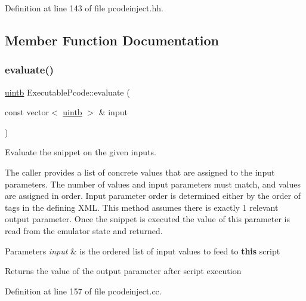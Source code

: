 Definition at line 143 of file pcodeinject.\+hh.



\subsection{Member Function Documentation}
\mbox{\label{class_executable_pcode_a0ff39a9bb778d67df86b741a20739d75}} 
\subsubsection{\texorpdfstring{evaluate()}{evaluate()}}
{\footnotesize\ttfamily \mbox{\hyperlink{types_8h_a2db313c5d32a12b01d26ac9b3bca178f}{uintb}} Executable\+Pcode\+::evaluate (\begin{DoxyParamCaption}\item[{const vector$<$ \mbox{\hyperlink{types_8h_a2db313c5d32a12b01d26ac9b3bca178f}{uintb}} $>$ \&}]{input }\end{DoxyParamCaption})}



Evaluate the snippet on the given inputs. 

The caller provides a list of concrete values that are assigned to the input parameters. The number of values and input parameters must match, and values are assigned in order. Input parameter order is determined either by the order of tags in the defining X\+ML. This method assumes there is exactly 1 relevant output parameter. Once the snippet is executed the value of this parameter is read from the emulator state and returned. 
\begin{DoxyParams}{Parameters}
{\em input} & is the ordered list of input values to feed to {\bfseries{this}} script \\
\hline
\end{DoxyParams}
\begin{DoxyReturn}{Returns}
the value of the output parameter after script execution 
\end{DoxyReturn}


Definition at line 157 of file pcodeinject.\+cc.

